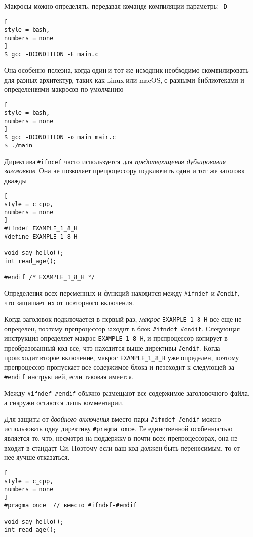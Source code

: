 \documentclass[%
	11pt,
	a4paper,
	utf8,
		]{article}
\begin{document}
Макросы можно определять, передавая команде компиляции параметры \verb|-D|
\begin{lstlisting}[
style = bash,
numbers = none
]
$ gcc -DCONDITION -E main.c
\end{lstlisting}

Она особенно полезна, когда один и тот же исходник необходимо скомпилировать для разных архитектур, таких как Linux или macOS, с разными библиотеками и определениями макросов по умолчанию
\begin{lstlisting}[
style = bash,
numbers = none
]
$ gcc -DCONDITION -o main main.c
$ ./main
\end{lstlisting}

Директива \verb|#ifndef| часто используется для \emph{предотвращения дублирования заголовков}. Она не позволяет препроцессору подключить один и тот же заголовк дважды
\begin{lstlisting}[
style = c_cpp,
numbers = none
]
#ifndef EXAMPLE_1_8_H
#define EXAMPLE_1_8_H

void say_hello();
int read_age();

#endif /* EXAMPLE_1_8_H */
\end{lstlisting}

Определения всех переменных и функций находится между \verb|#ifndef| и \verb|#endif|, что защищает их от повторного включения.

Когда заголовок подключается в первый раз, \emph{макрос} \verb|EXAMPLE_1_8_H| все еще не определен, поэтому препроцессор заходит в блок \verb|#ifndef-#endif|. Следующая инструкция определяет макрос \verb|EXAMPLE_1_8_H|, и препроцессор копирует в преобразованный код все, что находится выше директивы \verb|#endif|. Когда происходит второе включение, макрос \verb|EXAMPLE_1_8_H| уже определен, поэтому препроцессор пропускает все содержимое блока и переходит к следующей за \verb|#endif| инструкцией, если таковая имеется.

Между \verb|#ifndef-#endif| обычно размещают все содержимое заголовочного файла, а снаружи остаются лишь комментарии.

Для защиты от \emph{двойного включения} вместо пары \verb|#ifndef-#endif| можно использовать одну директиву \verb|#pragma once|. Ее единственной особенностью является то, что, несмотря на поддержку в почти всех препроцессорах, она не входит в стандарт Си. Поэтому если ваш код должен быть переносимым, то от нее лучше отказаться.
\begin{lstlisting}[
style = c_cpp,
numbers = none
]
#pragma once  // вместо #ifndef-#endif

void say_hello();
int read_age();
\end{lstlisting}  
\end{document}
